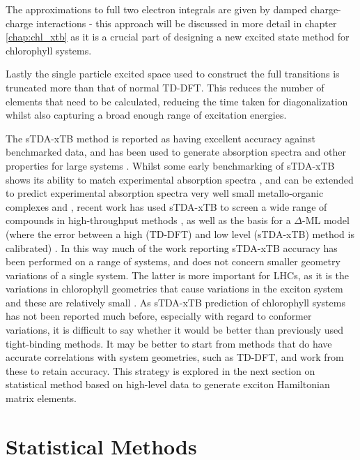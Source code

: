 The approximations to full two electron integrals are given by damped charge-charge
interactions - this approach will be discussed in more detail in chapter \ref{chap:chl_xtb}
as it is a crucial part of designing a new excited state method for chlorophyll systems. 

Lastly the single particle excited space used to construct the full transitions
is truncated more than that of normal TD-DFT. This reduces the number of elements
that need to be calculated, reducing the time taken for diagonalization whilst also
capturing a broad enough range of excitation energies. 

The sTDA-xTB method is reported as having excellent accuracy against benchmarked
data, and has been used to generate absorption spectra and other properties for 
large systems \cite{Grimme2016, Seibert2019, Wilbraham2018, Verma2022, HeathApostolopoulos2019}. 
Whilst some early benchmarking of sTDA-xTB shows its ability to match experimental
absorption spectra \cite{Grimme2016}, and can be extended to predict experimental
absorption spectra very well small metallo-organic complexes and \cite{Seibert2019},
recent work has used sTDA-xTB to screen a wide range of compounds in high-throughput
methods \cite{Wilbraham2018}, as well as the basis for a $\Delta$-ML model (where
the error between a high (TD-DFT) and low level (sTDA-xTB) method is calibrated) \cite{Verma2022}.
In this way much of the work reporting sTDA-xTB accuracy has been performed on a 
range of systems, and does not concern smaller geometry variations of a single system. 
The latter is more important for LHCs, as it is the variations in chlorophyll geometries
that cause variations in the exciton system and these are relatively small \cite{Sirohiwal2020}.
As sTDA-xTB prediction of chlorophyll systems has not been reported much before, 
especially with regard to conformer variations, it is difficult to say whether it
would be better than previously used tight-binding methods. It may be better to start
from methods that do have accurate correlations with system geometries, such as
TD-DFT, and work from these to retain accuracy. This strategy is explored in the
next section on statistical method based on high-level data to generate exciton
Hamiltonian matrix elements.

\section{Statistical Methods}
\label{sec:stats_methods}

